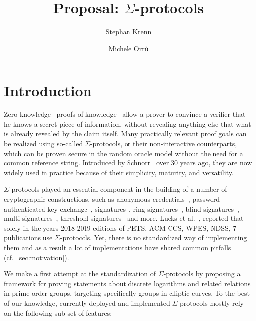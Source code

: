 \documentclass[runningheads,11pt]{article}
\begin{document}
\title{Proposal: $\Sigma$-protocols}
%

\author{Stephan Krenn \and
        Michele Orr\`u}
%
\maketitle              %
%
\tableofcontents

\section{Introduction}

Zero-knowledge~\cite{GolMicRac89} proofs of knowledge~\cite{C:BelGol92} allow a prover to convince a verifier that he knows a secret piece of information, without revealing anything else that what is already revealed by the claim itself.
Many practically relevant proof goals can be realized using so-called $\Sigma$-protocols, or their non-interactive counterparts, which can be proven secure in the random oracle model without the need for a common reference string.
Introduced by Schnorr~\cite{JC:Schnorr91} over 30 years ago, they are now widely used  in practice because of their simplicity, maturity, and versatility.

$\Sigma$-protocols played an essential component in the building of a number of cryptographic
constructions,
such as anonymous credentials~\cite{CCS:ChaMeiZav14}, password-authenticated key exchange~\cite{jpake}, signatures~\cite{C:Schnorr89},
ring signatures~\cite{borromeansig}, blind signatures~\cite{CCS:PoiSte97}, multi signatures~\cite{CCS:NRSW20}, threshold signatures~\cite{EPRINT:KomGol20} and more.
Lueks et al.~\cite{zksk}, reported that solely in the years 2018-2019 editions of PETS, ACM CCS, WPES, NDSS,
7 publications use  $\Sigma$-protocols.
Yet, there is no standardized way of implementing them and as a result a lot of implementations have shared common pitfalls (cf.\ \cref{sec:motivation}).

We make a first attempt at the standardization of $\Sigma$-protocols by proposing a framework for proving statements about discrete logarithms and related relations in prime-order groups, targeting specifically groups in elliptic curves. To the best of our knowledge, currently deployed and implemented $\Sigma$-protocols mostly rely on the following sub-set of features:
\end{document}
